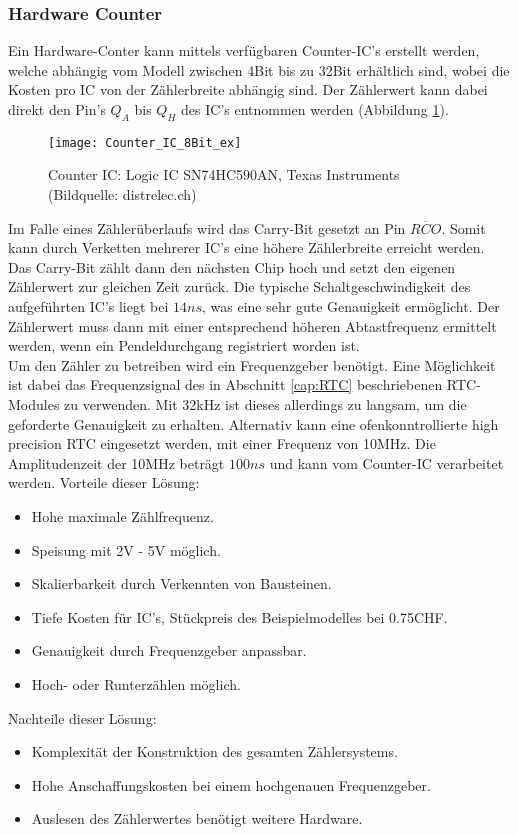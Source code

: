 	\subsubsection{Hardware Counter}
		Ein Hardware-Conter kann mittels verfügbaren Counter-IC's erstellt werden, welche abhängig vom Modell zwischen 4Bit bis zu 32Bit erhältlich sind, wobei die Kosten pro IC von der Zählerbreite abhängig sind. Der Zählerwert kann dabei direkt den Pin's $Q_A$ bis $Q_H$ des IC's entnommen werden (Abbildung \ref{fig:SN74HC590AN}).
		\begin{figure}[H]
        	\centering
        	\texttt{[image: Counter\_IC\_8Bit\_ex]}
        	\caption{Counter IC: Logic IC SN74HC590AN, Texas Instruments (Bildquelle: distrelec.ch)}
        	\label{fig:SN74HC590AN}
    	\end{figure}
    Im Falle eines Zählerüberlaufs wird das Carry-Bit gesetzt an Pin $\overline{RCO}$. Somit kann durch Verketten mehrerer IC's eine höhere Zählerbreite erreicht werden. Das Carry-Bit zählt dann den nächsten Chip hoch und setzt den eigenen Zählerwert zur gleichen Zeit zurück. Die typische Schaltgeschwindigkeit des aufgeführten IC's liegt bei $14ns$, was eine sehr gute Genauigkeit ermöglicht. Der Zählerwert muss dann mit einer entsprechend höheren Abtastfrequenz ermittelt werden, wenn ein Pendeldurchgang registriert worden ist.\\
Um den Zähler zu betreiben wird ein Frequenzgeber benötigt. Eine Möglichkeit ist dabei das Frequenzsignal des in Abschnitt \ref{cap:RTC} beschriebenen RTC-Modules zu verwenden. Mit 32kHz ist dieses allerdings zu langsam, um die geforderte Genauigkeit zu erhalten. Alternativ kann eine ofenkonntrollierte high precision RTC eingesetzt werden, mit einer Frequenz von 10MHz. Die Amplitudenzeit der 10MHz beträgt $100ns$ und kann vom Counter-IC verarbeitet werden.
    Vorteile dieser Lösung:
    \begin{itemize}
    	\item Hohe maximale Zählfrequenz.
    	\item Speisung mit 2V - 5V möglich.
    	\item Skalierbarkeit durch Verkennten von Bausteinen.
    	\item Tiefe Kosten für IC's, Stückpreis des Beispielmodelles bei 0.75CHF.
    	\item Genauigkeit durch Frequenzgeber anpassbar.
    	\item Hoch- oder Runterzählen möglich.
    \end{itemize}
    Nachteile dieser Lösung:
    \begin{itemize}
    	\item Komplexität der Konstruktion des gesamten Zählersystems.
    	\item Hohe Anschaffungskosten bei einem hochgenauen Frequenzgeber.
    	\item Auslesen des Zählerwertes benötigt weitere Hardware.
    \end{itemize}
